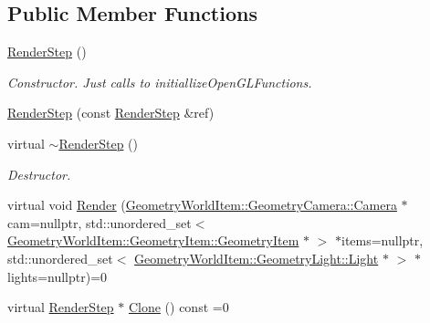 \subsection*{Public Member Functions}
\begin{DoxyCompactItemize}
\item 
\mbox{\label{class_geometry_engine_1_1_geometry_render_step_1_1_render_step_a29106dd29348ba75cee5cbe8b9679b78}} 
\mbox{\hyperlink{class_geometry_engine_1_1_geometry_render_step_1_1_render_step_a29106dd29348ba75cee5cbe8b9679b78}{Render\+Step}} ()
\begin{DoxyCompactList}\small\item\em Constructor. Just calls to initiallize\+Open\+G\+L\+Functions. \end{DoxyCompactList}\item 
\mbox{\hyperlink{class_geometry_engine_1_1_geometry_render_step_1_1_render_step_a0a1c36303ca0342f1bf9afcecb35e513}{Render\+Step}} (const \mbox{\hyperlink{class_geometry_engine_1_1_geometry_render_step_1_1_render_step}{Render\+Step}} \&ref)
\item 
\mbox{\label{class_geometry_engine_1_1_geometry_render_step_1_1_render_step_a3dcb308f27e22b11e3145d61d24676b3}} 
virtual \mbox{\hyperlink{class_geometry_engine_1_1_geometry_render_step_1_1_render_step_a3dcb308f27e22b11e3145d61d24676b3}{$\sim$\+Render\+Step}} ()
\begin{DoxyCompactList}\small\item\em Destructor. \end{DoxyCompactList}\item 
virtual void \mbox{\hyperlink{class_geometry_engine_1_1_geometry_render_step_1_1_render_step_a9b054ee8f38304319a9d03ba3e173dcd}{Render}} (\mbox{\hyperlink{class_geometry_engine_1_1_geometry_world_item_1_1_geometry_camera_1_1_camera}{Geometry\+World\+Item\+::\+Geometry\+Camera\+::\+Camera}} $\ast$cam=nullptr, std\+::unordered\+\_\+set$<$ \mbox{\hyperlink{class_geometry_engine_1_1_geometry_world_item_1_1_geometry_item_1_1_geometry_item}{Geometry\+World\+Item\+::\+Geometry\+Item\+::\+Geometry\+Item}} $\ast$ $>$ $\ast$items=nullptr, std\+::unordered\+\_\+set$<$ \mbox{\hyperlink{class_geometry_engine_1_1_geometry_world_item_1_1_geometry_light_1_1_light}{Geometry\+World\+Item\+::\+Geometry\+Light\+::\+Light}} $\ast$ $>$ $\ast$lights=nullptr)=0
\item 
virtual \mbox{\hyperlink{class_geometry_engine_1_1_geometry_render_step_1_1_render_step}{Render\+Step}} $\ast$ \mbox{\hyperlink{class_geometry_engine_1_1_geometry_render_step_1_1_render_step_afe33ea9d82c5be11f55af7d39691d44b}{Clone}} () const =0
\end{DoxyCompactItemize}
